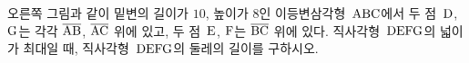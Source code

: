 \noindent\begin{minipage}[t]{0.58\linewidth}\vspace{0pt}\raggedright 오른쪽 그림과 같이 밑변의 길이가 $10$, 높이가 $8$인 이등변삼각형~$\mathrm{ABC}$에서 두 점~$\mathrm{D}$, $\mathrm{G}$는 각각 $\overline{\mathrm{AB}}$, $\overline{\mathrm{AC}}$ 위에 있고, 두 점~$\mathrm{E}$, $\mathrm{F}$는 $\overline{\mathrm{BC}}$ 위에 있다. 직사각형~$\mathrm{DEFG}$의 넓이가 최대일 때, 직사각형~$\mathrm{DEFG}$의 둘레의 길이를 구하시오.\end{minipage}\hfill\begin{minipage}[t]{0.4\linewidth}\vspace{0pt}\centering \resizebox{\ifdim\width>\linewidth\linewidth\else\width\fi}{!}{}\end{minipage}\par
